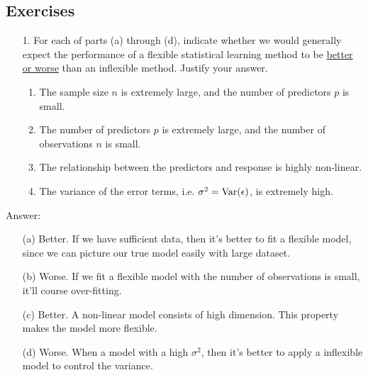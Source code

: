     \documentclass[12pt,fleqn,a4paper]{article}
\theoremstyle{definition}
\theoremstyle{plain}
\begin{document}
\subsection{\textbf{Exercises}}
\begin{enumerate}
\item[1.] For each of parts (a) through (d), indicate whether we would generally
expect the performance of a flexible statistical learning method to be
\underline{better or worse} than an inflexible method. Justify your answer.
    \begin{enumerate}
        \item The sample size $n$ is extremely large, and the number of predictors $p$ is small.
        \item The number of predictors $p$ is extremely large, and the number of observations $n$ is small.
        \item The relationship between the predictors and response is highly non-linear.
        \item The variance of the error terms, i.e. $\sigma^{2} = {\rm Var}(\epsilon)$, is extremely high.
    \end{enumerate}
\end{enumerate}

\begin{framed}
Answer:
    \begin{enumerate}
        \item[(a)] Better. If we have sufficient data, then it's better to fit a flexible model, since we can picture our true model easily with large dataset.
        \item[(b)] Worse. If we fit a flexible model with the number of observations is small, it'll course over-fitting.
        \item[(c)] Better. A non-linear model consists of high dimension. This property makes the model more flexible.
        \item[(d)] Worse. When a model with a high $\sigma^{2}$, then it's better to apply a inflexible model to control the variance.
    \end{enumerate}
\end{framed}

\end{document}

